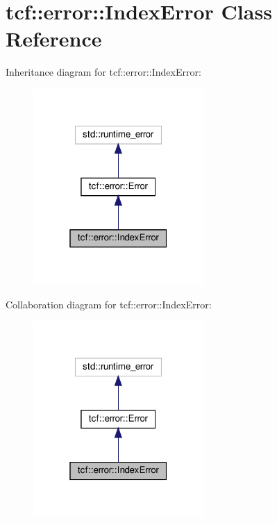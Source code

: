\hypertarget{classtcf_1_1error_1_1IndexError}{}\section{tcf\+:\+:error\+:\+:Index\+Error Class Reference}
\label{classtcf_1_1error_1_1IndexError}


Inheritance diagram for tcf\+:\+:error\+:\+:Index\+Error\+:
\nopagebreak
\begin{figure}[H]
\begin{center}
\leavevmode
\includegraphics[width=184pt]{classtcf_1_1error_1_1IndexError__inherit__graph}
\end{center}
\end{figure}


Collaboration diagram for tcf\+:\+:error\+:\+:Index\+Error\+:
\nopagebreak
\begin{figure}[H]
\begin{center}
\leavevmode
\includegraphics[width=184pt]{classtcf_1_1error_1_1IndexError__coll__graph}
\end{center}
\end{figure}
